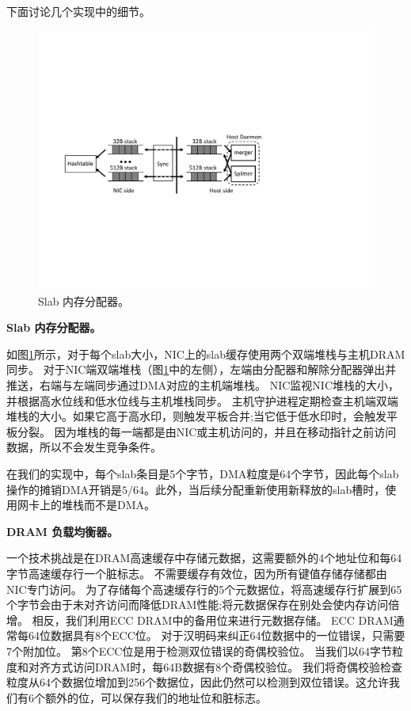 下面讨论几个实现中的细节。


\begin{figure}[t]
\centering
\includegraphics[width=.8\textwidth,page=1]{figure/cropped_slab.pdf}
\caption{Slab 内存分配器。}
\label{kvdirect:fig:slab}

\end{figure}

\textbf {Slab 内存分配器。}

如图\ref {kvdirect:fig:slab}所示，对于每个slab大小，NIC上的slab缓存使用两个双端堆栈与主机DRAM同步。
对于NIC端双端堆栈（图\ref {kvdirect:fig:slab}中的左侧），左端由分配器和解除分配器弹出并推送，右端与左端同步通过DMA对应的​​主机端堆栈。
NIC监视NIC堆栈的大小，并根据高水位线和低水位线与主机堆栈同步。
主机守护进程定期检查主机端双端堆栈的大小。如果它高于高水印，则触发平板合并;当它低于低水印时，会触发平板分裂。
因为堆栈的每一端都是由NIC或主机访问的，并且在移动指针之前访问数据，所以不会发生竞争条件。

在我们的实现中，每个slab条目是5个字节，DMA粒度是64个字节，因此每个slab操作的摊销DMA开销是$ 5/64 $。此外，当后续分配重新使用新释放的slab槽时，使用网卡上的堆栈而不是DMA。


\textbf{DRAM 负载均衡器。}

一个技术挑战是在DRAM高速缓存中存储元数据，这需要额外的4个地址位和每64字节高速缓存行一个脏标志。
不需要缓存有效位，因为所有键值存储存储都由NIC专门访问。
为了存储每个高速缓存行的5个元数据位，将高速缓存行扩展到65个字节会由于未对齐访问而降低DRAM性能;将元数据保存在别处会使内存访问倍增。
相反，我们利用ECC DRAM中的备用位来进行元数据存储。
ECC DRAM通常每64位数据具有8个ECC位。
对于汉明码来纠正64位数据中的一位错误，只需要7个附加位。
第8个ECC位是用于检测双位错误的奇偶校验位。
当我们以64字节粒度和对齐方式访问DRAM时，每64B数据有8个奇偶校验位。
我们将奇偶校验检查粒度从64个数据位增加到256个数据位，因此仍然可以检测到双位错误。这允许我们有6个额外的位，可以保存我们的地址位和脏标志。

